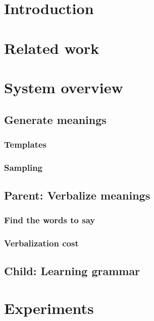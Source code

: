 \documentclass[a4paper]{article}
\begin{document}
\section{Introduction}
\section{Related work}
\section{System overview}
\subsection{Generate meanings}
\subsubsection{Templates}
\subsubsection{Sampling}
\subsection{Parent: Verbalize meanings}
\subsubsection{Find the words to say}
\subsubsection{Verbalization cost}
\subsection{Child: Learning grammar}
\section{Experiments}
\end{document}
